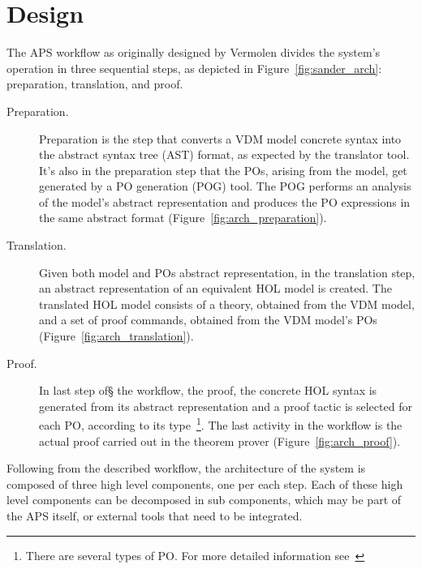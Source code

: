\documentclass[]{article}
\begin{document}
\section{Design}
\label{sec:intended_design}

%
%

The APS workflow as originally designed by Vermolen divides the system's operation in three sequential steps, as depicted in Figure~\ref{fig:sander_arch}: preparation, translation, and proof.

\begin{description}
  \item[Preparation.] Preparation is the step that converts a VDM model concrete syntax into the abstract syntax tree (AST) format, as expected by the translator tool.
	It's also in the preparation step that the POs, arising from the model, get generated by a PO generation (POG) tool.
	The POG performs an analysis of the model's abstract representation and produces the PO expressions in the same abstract format (Figure~\ref{fig:arch_preparation}).

  \item[Translation.] Given both model and POs abstract representation, in the translation step, an abstract representation of an equivalent HOL model is created. 
	The translated HOL model consists of a theory, obtained from the VDM model, and a set of proof commands, obtained from the VDM model's POs (Figure~\ref{fig:arch_translation}).

  \item[Proof.] In last step of§ the workflow, the proof, the concrete HOL syntax is generated from its abstract representation and a proof tactic is selected for each PO, according to its type~\footnote{There are several types of PO. For more detailed information see~\cite{CSK:2007lr}}. The last activity in the workflow is the actual proof carried out in the theorem prover (Figure~\ref{fig:arch_proof}).
\end{description}

Following from the described workflow, the architecture of the system is composed of three high level components, one per each step.
Each of these high level components can be decomposed in sub components, which may be part of the APS itself, or external tools that need to be integrated.
\end{document}
